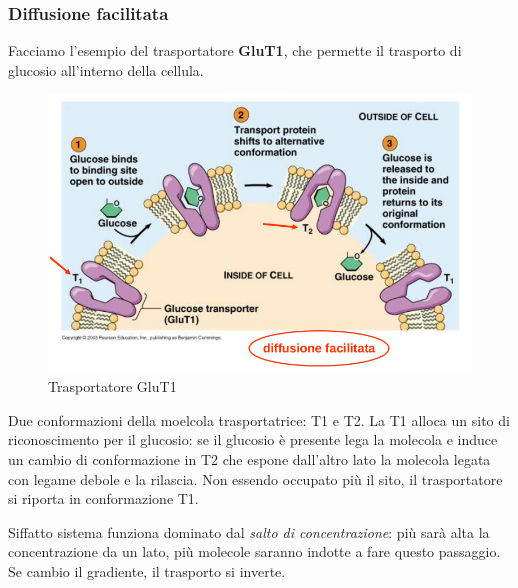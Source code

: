 \documentclass[a4paper,12pt]{article}
\begin{document}
\subsubsection{Diffusione facilitata}
Facciamo l'esempio del trasportatore \textbf{GluT1}, che permette il trasporto di glucosio all'interno della cellula.
\begin{figure}[H]
\centering
\includegraphics[scale=0.3]{immagine/glut.jpg}
\caption{Trasportatore GluT1}
\end{figure}
Due conformazioni della moelcola trasportatrice: T1 e T2.
La T1 alloca un sito di riconoscimento per
il glucosio: se il glucosio è presente lega la
molecola e induce un cambio di conformazione in T2 che espone dall'altro lato la
molecola legata con legame debole e la
rilascia. Non essendo occupato più il sito,
il trasportatore si riporta in conformazione
T1.

Siffatto sistema funziona dominato dal \emph{salto di concentrazione}: più sarà alta la concentrazione
da un lato, più molecole saranno indotte a fare
questo passaggio. Se cambio il gradiente, il trasporto si inverte.
\end{document}
